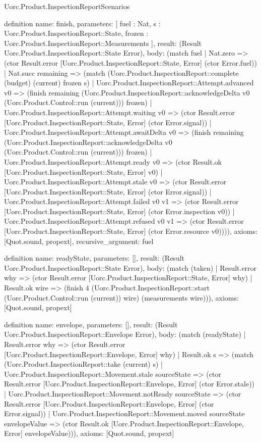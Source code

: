 \begin{lexlean}{Uorc.Product.InspectionReportScenarios}
\begin{semanticmodule}
definition{
  name: finish,
  parameters: [
    fuel : Nat,
    s : Uorc.Product.InspectionReport::State,
    frozen : Uorc.Product.InspectionReport::Measurements
  ],
  result: (Result Uorc.Product.InspectionReport::State Error),
  body: (match fuel
    | Nat.zero => (ctor Result.error [Uorc.Product.InspectionReport::State, Error] (ctor Error.fuel))
    | Nat.succ remaining => (match (Uorc.Product.InspectionReport::complete (budget) (current) frozen s)
      | Uorc.Product.InspectionReport::Attempt.advanced v0 => (finish remaining (Uorc.Product.InspectionReport::acknowledgeDelta v0 (Uorc.Product.Control::run (current))) frozen)
      | Uorc.Product.InspectionReport::Attempt.waiting v0 => (ctor Result.error [Uorc.Product.InspectionReport::State, Error] (ctor Error.signal))
      | Uorc.Product.InspectionReport::Attempt.awaitDelta v0 => (finish remaining (Uorc.Product.InspectionReport::acknowledgeDelta v0 (Uorc.Product.Control::run (current))) frozen)
      | Uorc.Product.InspectionReport::Attempt.ready v0 => (ctor Result.ok [Uorc.Product.InspectionReport::State, Error] v0)
      | Uorc.Product.InspectionReport::Attempt.stale v0 => (ctor Result.error [Uorc.Product.InspectionReport::State, Error] (ctor Error.signal))
      | Uorc.Product.InspectionReport::Attempt.failed v0 v1 => (ctor Result.error [Uorc.Product.InspectionReport::State, Error] (ctor Error.inspection v0))
      | Uorc.Product.InspectionReport::Attempt.refused v0 v1 => (ctor Result.error [Uorc.Product.InspectionReport::State, Error] (ctor Error.resource v0)))),
  axioms: [Quot.sound, propext],
  recursive_argument: fuel
}

definition{
  name: readyState,
  parameters: [],
  result: (Result Uorc.Product.InspectionReport::State Error),
  body: (match (taken)
    | Result.error why => (ctor Result.error [Uorc.Product.InspectionReport::State, Error] why)
    | Result.ok wire => (finish 4 (Uorc.Product.InspectionReport::start (Uorc.Product.Control::run (current)) wire) (measurements wire))),
  axioms: [Quot.sound, propext]
}

definition{
  name: envelope,
  parameters: [],
  result: (Result Uorc.Product.InspectionReport::Envelope Error),
  body: (match (readyState)
    | Result.error why => (ctor Result.error [Uorc.Product.InspectionReport::Envelope, Error] why)
    | Result.ok s => (match (Uorc.Product.InspectionReport::take (current) s)
      | Uorc.Product.InspectionReport::Movement.stale sourceState => (ctor Result.error [Uorc.Product.InspectionReport::Envelope, Error] (ctor Error.stale))
      | Uorc.Product.InspectionReport::Movement.notReady sourceState => (ctor Result.error [Uorc.Product.InspectionReport::Envelope, Error] (ctor Error.signal))
      | Uorc.Product.InspectionReport::Movement.moved sourceState envelopeValue => (ctor Result.ok [Uorc.Product.InspectionReport::Envelope, Error] envelopeValue))),
  axioms: [Quot.sound, propext]
}


\end{semanticmodule}
\end{lexlean}
